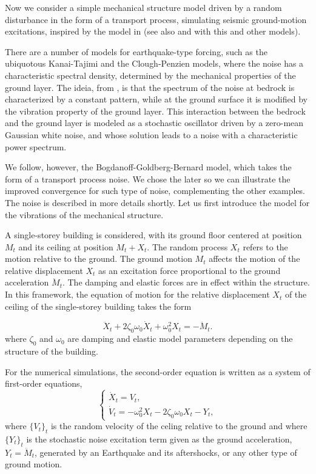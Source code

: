 \documentclass[reqno,12pt]{amsart}
\theoremstyle{plain} %
\theoremstyle{definition} %
\begin{document}
Now we consider a simple mechanical structure model driven by a random disturbance in the form of a transport process, simulating seismic ground-motion excitations, inspired by the model in \cite{BogdanoffGoldbergBernard1961} (see also \cite[Chapter 18]{NeckelRupp2013} and \cite{HousnerJenning1964} with this and other models).

There are a number of models for earthquake-type forcing, such as the ubiquotous Kanai-Tajimi and the Clough-Penzien models, where the noise has a characteristic spectral density, determined by the mechanical properties of the ground layer. The ideia, from \cite{Kanai1957}, is that the spectrum of the noise at bedrock is characterized by a constant pattern, while at the ground surface it is modified by the vibration property of the ground layer. This interaction between the bedrock and the ground layer is modeled as a stochastic oscillator driven by a zero-mean Gaussian white noise, and whose solution leads to a noise with a characteristic power spectrum.

We follow, however, the Bogdanoff-Goldberg-Bernard model, which takes the form of a transport process noise. We chose the later so we can illustrate the improved convergence for such type of noise, complementing the other examples. The noise is described in more details shortly. Let us first introduce the model for the vibrations of the mechanical structure.

A single-storey building is considered, with its ground floor centered at position $M_t$ and its ceiling at position $M_t + X_t$. The random process $X_t$ refers to the motion relative to the ground. The ground motion $M_t$ affects the motion of the relative displacement $X_t$ as an excitation force proportional to the ground acceleration $\ddot M_t$. The damping and elastic forces are in effect within the structure. In this framework, the equation of motion for the relative displacement $X_t$ of the ceiling of the single-storey building takes the form

\begin{equation}
    \label{mechanicalstructuremodel}
    \ddot X_t + 2\zeta_0\omega_0\dot X_t + \omega_0^2 X_t = - \ddot M_t.
\end{equation}
where $\zeta_0$ and $\omega_0$ are damping and elastic model parameters depending on the structure of the building.

For the numerical simulations, the second-order equation is written as a system of first-order equations,
\[
    \begin{cases}
        \dot X_t = V_t, \\
        \dot V_t = - \omega_0^2 X_t - 2\zeta_0\omega_0 X_t - Y_t,
    \end{cases}
\]
where $\{V_t\}_t$ is the random velocity of the celing relative to the ground and where $\{Y_t\}_t$ is the stochastic noise excitation term given as the ground acceleration, $Y_t = \ddot M_t$, generated by an Earthquake and its aftershocks, or any other type of ground motion.
\end{document}
